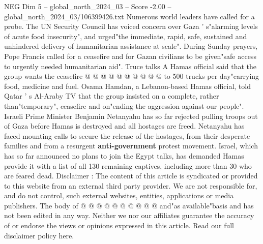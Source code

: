\begin{textsample}{NEG Dim 5 – global\_north\_2024\_03 – Score -2.00 – global\_north\_2024\_03/106399426.txt}
Numerous world leaders have called for a probe.
The UN Security Council has voiced concern over Gaza ' s"alarming levels of acute food insecurity", and urged"the immediate, rapid, safe, sustained and unhindered delivery of humanitarian assistance at scale".
During Sunday prayers, Pope Francis called for a ceasefire and for Gazan civilians to be given"safe access to urgently needed humanitarian aid".
Truce talks A Hamas official said that the group wants the ceasefire @ @ @ @ @ @ @ @ @ @ to 500 trucks per day"carrying food, medicine and fuel.
Osama Hamdan, a Lebanon-based Hamas official, told Qatar ' s Al-Araby TV that the group insisted on a complete, rather than"temporary", ceasefire and on"ending the aggression against our people".
Israeli Prime Minister Benjamin Netanyahu has so far rejected pulling troops out of Gaza before Hamas is destroyed and all hostages are freed.
Netanyahu has faced mounting calls to secure the release of the hostages, from their desperate families and from a resurgent \textbf{anti-government} protest movement.
Israel, which has so far announced no plans to join the Egypt talks, has demanded Hamas provide it with a list of all 130 remaining captives, including more than 30 who are feared dead.
Disclaimer : The content of this article is syndicated or provided to this website from an external third party provider.
We are not responsible for, and do not control, such external websites, entities, applications or media publishers.
The body of @ @ @ @ @ @ @ @ @ @ and"as available"basis and has not been edited in any way.
Neither we nor our affiliates guarantee the accuracy of or endorse the views or opinions expressed in this article.
Read our full disclaimer policy here.

\end{textsample}
